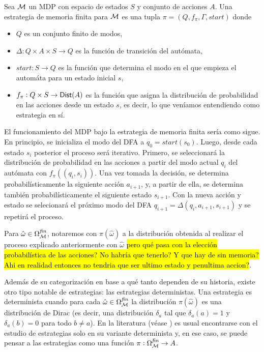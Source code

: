 \begin{definition}
	Sea $\mathcal{M}$ un MDP con espacio de estados $S$ y conjunto de acciones $A$. Una estrategia de memoria finita para $\mathcal{M}$ es una tupla $\pi = (Q, f_\pi, \Gamma, start)$ donde
	\begin{itemize}
		\item $Q$ es un conjunto finito de modos,
		\item $\Delta : Q \times A \times S \rightarrow Q$ es la función de transición del autómata,
		\item $start: S \rightarrow Q$ es la función que determina el modo en el que empieza el automáta para un estado inicial $s$,
		\item $f_\pi : Q \times S \rightarrow \mathsf{Dist}(A)$ es la función que asigna la distribución de probabilidad en las acciones desde un estado $s$, es decir, lo que veníamos entendiendo como estrategia en sí.
	\end{itemize}
	El funcionamiento del MDP bajo la estrategia de memoria finita sería como sigue. En principio, se inicializa el modo del DFA a $q_0 = start(s_0)$. Luego, desde cada estado $s_i$ posterior el proceso será iterativo. Primero, se seleccionará la distribución de probabilidad en las acciones a partir del modo actual $q_i$ del autómata con $f_\pi((q_i,s_i))$. Una vez tomada la decisión, se determina probabilísticamente la siguiente acción $a_{i+1}$, y, a partir de ella, se determina también probabilísticamente el siguiente estado $s_{i+1}$. Con la nueva acción y estado se selecionará el próximo modo del DFA $q_{i+1} = \Delta(q_i, a_{i+1}, s_{i+1})$ y se repetirá el proceso.

	Para $\hat \omega \in \Omega^{\textit{fin}}_{\mathcal{M}}$, notaremos con $\pi(\hat
		\omega)$ a la distribución obtenida al realizar el proceso explicado
	anteriormente con $\hat \omega$ \hl{pero qué pasa con la elección
		probabilística de las acciones? No habría que tenerlo? Y que hay de sin
		memoria? Ahi en realidad entonces no tendria que ser ultimo estado y penultima
		accion?}.
\end{definition}

Además de su categorización en base a qué tanto dependen de su historia, existe
otro tipo notable de estrategias: las estrategias deterministas. Una estrategia
es determinista cuando para cada $\hat \omega \in \Omega^{\textit{fin}}_{\mathcal{M}}$ la
distribución $\pi(\hat \omega)$ es una distribución de Dirac (es decir, una
distribución $\delta_a$ tal que $\delta_a(a) = 1$ y $\delta_a(b) = 0$ para todo
$b \neq a$). En la literatura (véase \cite{BaierKatoen, AlfaroThesis}) es usual
encontrarse con el estudio de estrategias solo en su variante determinista y,
en ese caso, se puede pensar a las estrategias como una función $\pi:
	\Omega^{\textit{fin}}_{\mathcal{M}} \rightarrow A$.


